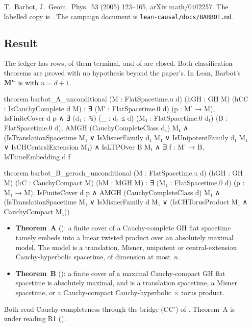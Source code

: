 T.~Barbot, J.\ Geom.\ Phys.\ 53 (2005) 123--165, arXiv math/0402257. The labelled copy is
. The campaign document is
\texttt{lean-causal/docs/BARBOT.md}.

\subsection{Result}

The ledger has \numBarbotStatements{} rows, \numBarbotTerminal{} of them terminal, and
\numBarbotClosed{} of \numBarbotTarget{} are closed. Both classification theorems are proved
with no hypothesis beyond the paper's. In Lean, Barbot's $\mathbf{M}^n$ is  with
$n=d+1$.

\begin{leancode}
theorem barbot_A_unconditional (M : FlatSpacetime.{u} d) (hGH : GH M)
    (hCC : IsCauchyComplete d M) :
    ∃ (M' : FlatSpacetime.{0} d) (p : M' → M), IsFiniteCover d p ∧
      ∃ (d₁ : ℕ) (_ : d₁ ≤ d) (M₁ : FlatSpacetime.{0} d₁) (B : FlatSpacetime.{0} d),
        AMGH (CauchyCompleteClass d₁) M₁ ∧
        (IsTranslationSpacetime M₁ ∨ IsMisnerFamily d₁ M₁ ∨ IsUnipotentFamily d₁ M₁ ∨
          IsCHCentralExtension M₁) ∧
        IsLTPOver B M₁ ∧ ∃ f : M' → B, IsTameEmbedding d f

theorem barbot_B_geroch_unconditional (M : FlatSpacetime.{u} d) (hGH : GH M)
    (hC : CauchyCompact M) (hM : MGH M) :
    ∃ (M₁ : FlatSpacetime.{0} d) (p : M₁ → M), IsFiniteCover d p ∧
      AMGH (CauchyCompleteClass d) M₁ ∧
      (IsTranslationSpacetime M₁ ∨ IsMisnerFamily d M₁ ∨
        (IsCHTorusProduct M₁ ∧ CauchyCompact M₁))
\end{leancode}

\begin{itemize}
\item \textbf{Theorem~A} (): a finite cover of a Cauchy-complete GH flat
  spacetime tamely embeds into a linear twisted product over an absolutely maximal model. The
  model is a translation, Misner, unipotent or central-extension Cauchy-hyperbolic spacetime, of
  dimension at most~$n$.
\item \textbf{Theorem~B} (): a finite cover of a maximal Cauchy-compact GH flat
  spacetime is absolutely maximal, and is a translation spacetime, a Misner spacetime, or a
  Cauchy-compact Cauchy-hyperbolic $\times$ torus product.
\end{itemize}
Both read Cauchy-completeness through the bridge (CC$'$) of . Theorem~A is under reading
R1 ().

